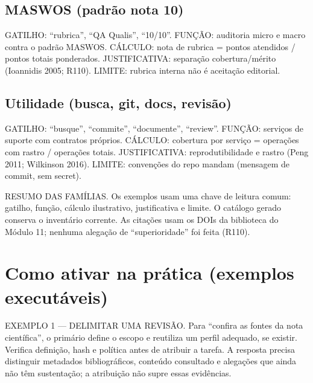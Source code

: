 \subsection{MASWOS (padrão nota 10)}

\begin{descricao}
GATILHO: ``rubrica'', ``QA Qualis'', ``10/10''. FUNÇÃO: auditoria micro e
macro contra o padrão MASWOS. CÁLCULO: nota de rubrica = pontos atendidos /
pontos totais ponderados. JUSTIFICATIVA: separação cobertura/mérito
(Ioannidis 2005; R110). LIMITE: rubrica interna não é aceitação editorial.
\end{descricao}

\subsection{Utilidade (busca, git, docs, revisão)}

\begin{descricao}
GATILHO: ``busque'', ``commite'', ``documente'', ``review''. FUNÇÃO:
serviços de suporte com contratos próprios. CÁLCULO: cobertura por serviço =
operações com rastro / operações totais. JUSTIFICATIVA: reprodutibilidade e
rastro (Peng 2011; Wilkinson 2016). LIMITE: convenções do repo mandam
(mensagem de commit, sem secret).
\end{descricao}

\begin{resultado}
RESUMO DAS FAMÍLIAS. Os exemplos usam uma chave de leitura comum:
gatilho, função, cálculo ilustrativo, justificativa e limite. O catálogo
gerado conserva o inventário corrente. As citações usam os DOIs da
biblioteca do Módulo 11; nenhuma alegação de ``superioridade'' foi feita
(R110).
\end{resultado}

\section{Como ativar na prática (exemplos executáveis)}

\begin{metodo}
EXEMPLO 1 — DELIMITAR UMA REVISÃO. Para ``confira as fontes da nota científica'',
o primário define o escopo e reutiliza um perfil adequado, se existir.
Verifica definição, hash e política antes de atribuir a tarefa. A resposta
precisa distinguir metadados bibliográficos, conteúdo consultado e alegações
que ainda não têm sustentação; a atribuição não supre essas evidências.
\end{metodo}

